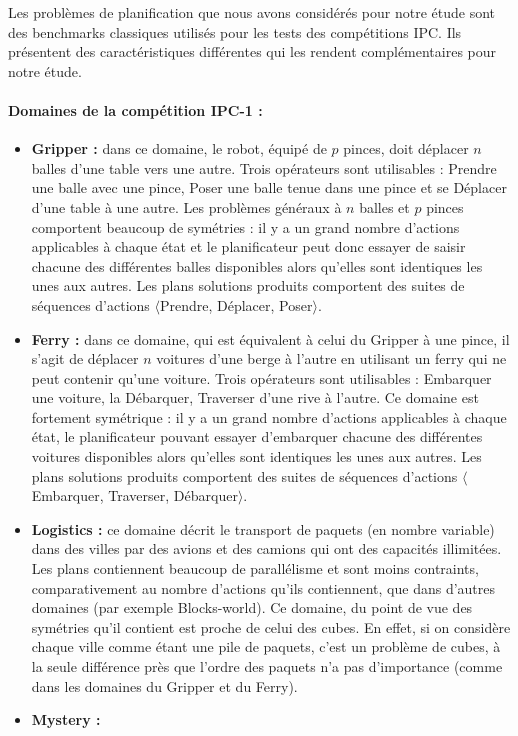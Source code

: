 Les problèmes de planification que nous avons considérés pour notre étude sont des benchmarks classiques utilisés pour les tests des compétitions IPC. Ils présentent des caractéristiques différentes qui les rendent complémentaires pour notre étude.

\paragraph*{Domaines de la compétition IPC-1 :}
\begin{itemize}
\item \textbf{Gripper :} dans ce domaine, le robot, équipé de $p$ pinces, doit déplacer $n$ balles d'une table vers une autre. Trois opérateurs sont utilisables : Prendre une balle avec une pince, Poser une balle tenue dans une pince et se Déplacer d'une table à une autre. Les problèmes généraux à $n$ balles et $p$ pinces comportent beaucoup de symétries : il y a un grand nombre d'actions applicables à chaque état et le planificateur peut donc essayer de saisir chacune des différentes balles disponibles alors qu'elles sont identiques les unes aux autres. Les plans solutions produits comportent des suites de séquences d'actions $\langle$Prendre, Déplacer, Poser$\rangle$.
\item \textbf{Ferry :}  dans ce domaine, qui est équivalent à celui du Gripper à une pince, il s'agit de déplacer $n$ voitures d'une berge à l'autre en utilisant un ferry qui ne peut contenir qu'une voiture. Trois opérateurs sont utilisables : Embarquer une voiture, la Débarquer, Traverser d'une rive à l'autre. Ce domaine est fortement symétrique : il y a un grand nombre d'actions applicables à chaque état, le planificateur pouvant essayer d'embarquer chacune des différentes voitures disponibles alors qu'elles sont identiques les unes aux autres. Les plans solutions produits comportent des suites de séquences d'actions $\langle$Embarquer, Traverser, Débarquer$\rangle$.
\item \textbf{Logistics :} ce domaine décrit le transport de paquets (en nombre variable) dans des villes par des avions et des camions qui ont des capacités illimitées. Les plans contiennent beaucoup de parallélisme et sont moins contraints, comparativement  au nombre d'actions qu'ils contiennent, que dans d'autres domaines (par exemple Blocks-world). Ce domaine, du point de vue des symétries qu'il contient est proche de celui des cubes. En effet, si on considère chaque ville comme étant une pile de paquets, c'est un problème de cubes, à la seule différence près que l'ordre des paquets n'a pas d'importance (comme dans les domaines du Gripper et du Ferry).
\item \textbf{Mystery :}
\end{itemize}

